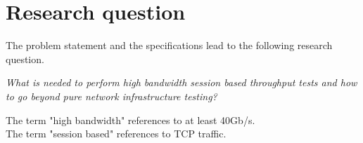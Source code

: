 \section{Research question}\label{sec:researchquestion}
The problem statement and the specifications lead to the following research question.

\begin{center}
\textit{What is needed to perform high bandwidth session based throughput tests and how to go beyond pure network infrastructure testing?} \\
\end{center}
The term "high bandwidth" references to at least 40Gb/s. \\
The term "session based" references to TCP traffic. \\

